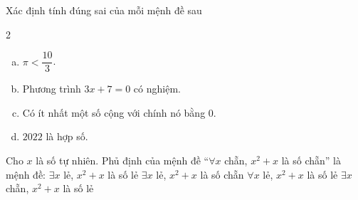 
\begin{bt}%
	Xác định tính đúng sai của mỗi mệnh đề sau
	\begin{multicols}{2}
		\begin{enumerate}[a)]
			\item $\pi<\dfrac{10}{3}$.
			\item Phương trình $3x+7=0$ có nghiệm.
			\item Có ít nhất một số cộng với chính nó bằng $0$.
			\item $2022$ là hợp số.
		\end{enumerate}
	\end{multicols}	
\end{bt}

\begin{ex}%
	Cho $x$ là số tự nhiên. Phủ định của mệnh đề  “$\forall x$ chẵn, $x^2+x$ là số chẵn” là mệnh đề:
	\choice 
		{$\exists x$ lẻ,  $x^2+x$ là số lẻ}
		{$\exists x$  lẻ, $x^2+x$ là số chẵn}
		{$\forall x$ lẻ, $x^2+x$  là số lẻ}
		{\True  $\exists x$ chẵn, $x^2+x$ là số lẻ}
\end{ex}

